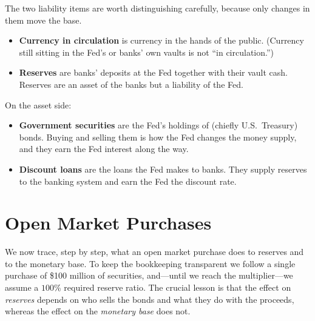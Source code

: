 The two liability items are worth distinguishing carefully, because only changes in them move the base.
\begin{itemize}
    \item \textbf{Currency in circulation} is currency in the hands of the public. (Currency still sitting in the Fed's or banks' own vaults is not ``in circulation.'')
    \item \textbf{Reserves} are banks' deposits at the Fed together with their vault cash. Reserves are an asset of the banks but a liability of the Fed.
\end{itemize}
On the asset side:
\begin{itemize}
    \item \textbf{Government securities} are the Fed's holdings of (chiefly U.S.\ Treasury) bonds. Buying and selling them is how the Fed changes the money supply, and they earn the Fed interest along the way.
    \item \textbf{Discount loans} are the loans the Fed makes to banks. They supply reserves to the banking system and earn the Fed the discount rate.
\end{itemize}


\section{Open Market Purchases}

We now trace, step by step, what an open market purchase does to reserves and to the monetary base. To keep the bookkeeping transparent we follow a single purchase of \$100 million of securities, and---until we reach the multiplier---we assume a $100\%$ required reserve ratio. The crucial lesson is that the effect on \emph{reserves} depends on who sells the bonds and what they do with the proceeds, whereas the effect on the \emph{monetary base} does not.

